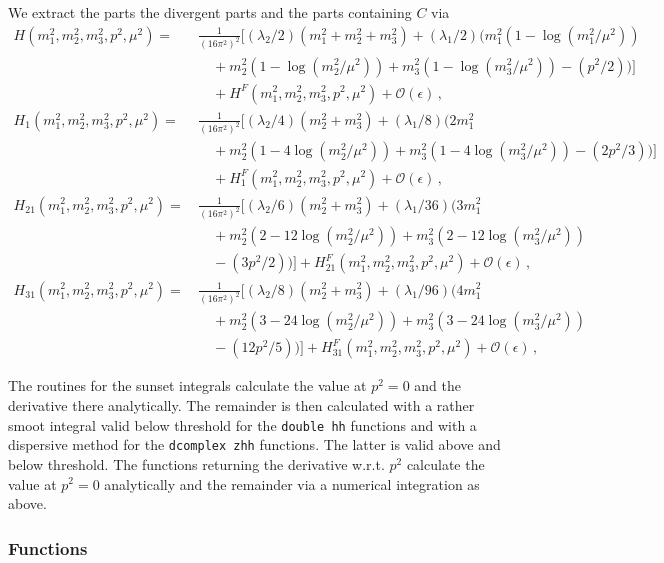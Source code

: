 \documentclass[12pt,a4paper]{article}
\newcommand{\mytt}[1]{\texttt{#1}}
\begin{document}
We extract the parts the divergent parts and the parts containing
$C$ via
\begin{align}
\label{defHF}
H(m_1^2,m_2^2,m_3^2,p^2,\mu^2) =\,&
\frac{1}{\left(16\pi^2\right)^2}
\Big[(\lambda_2/2)\left(m_1^2+m_2^2+m_3^2\right)
+(\lambda_1/2)\big(m_1^2(1-\log(m_1^2/\mu^2))
\nonumber\\&\quad
+m_2^2(1-\log(m_2^2/\mu^2))+m_3^2(1-\log(m_3^2/\mu^2))-(p^2/2)\big)\Big]
\nonumber\\&\quad
+H^F(m_1^2,m_2^2,m_3^2,p^2,\mu^2)+\mathcal{O}(\epsilon)\,,
\\
H_1(m_1^2,m_2^2,m_3^2,p^2,\mu^2) =\,&
\frac{1}{\left(16\pi^2\right)^2}
\Big[(\lambda_2/4)\left(m_2^2+m_3^2\right)
+(\lambda_1/8)\big(2m_1^2
\nonumber\\&\quad
+m_2^2(1-4\log(m_2^2/\mu^2))+m_3^2(1-4\log(m_3^2/\mu^2))-(2p^2/3)\big)\Big]
\nonumber\\&\quad
+H_1^F(m_1^2,m_2^2,m_3^2,p^2,\mu^2)+\mathcal{O}(\epsilon)\,,
\\
H_{21}(m_1^2,m_2^2,m_3^2,p^2,\mu^2) =\,&
\frac{1}{\left(16\pi^2\right)^2}
\Big[(\lambda_2/6)\left(m_2^2+m_3^2\right)
+(\lambda_1/36)\big(3m_1^2
\nonumber\\&\quad
+m_2^2(2-12\log(m_2^2/\mu^2))+m_3^2(2-12\log(m_3^2/\mu^2))
\nonumber\\&\quad
-(3p^2/2)\big)\Big]
+H_{21}^F(m_1^2,m_2^2,m_3^2,p^2,\mu^2)+\mathcal{O}(\epsilon)\,,
\\
H_{31}(m_1^2,m_2^2,m_3^2,p^2,\mu^2) =\,&
\frac{1}{\left(16\pi^2\right)^2}
\Big[(\lambda_2/8)\left(m_2^2+m_3^2\right)
+(\lambda_1/96)\big(4m_1^2
\nonumber\\&\quad
+m_2^2(3-24\log(m_2^2/\mu^2))
+m_3^2(3-24\log(m_3^2/\mu^2))
\nonumber\\&\quad
-(12p^2/5)\big)\Big]
+H_{31}^F(m_1^2,m_2^2,m_3^2,p^2,\mu^2)+\mathcal{O}(\epsilon)\,,
\end{align}

The routines for the sunset integrals calculate the value at $p^2=0$
and the derivative there analytically. The remainder is then calculated
with a rather smoot integral valid below threshold for the
\mytt{double hh} functions and with a dispersive method for the
\mytt{dcomplex zhh} functions. The latter is valid above and below
threshold. The functions returning the derivative w.r.t. $p^2$
calculate the value at $p^2=0$ analytically and the remainder via
a numerical integration as above.


\subsubsection{Functions}
\end{document}
